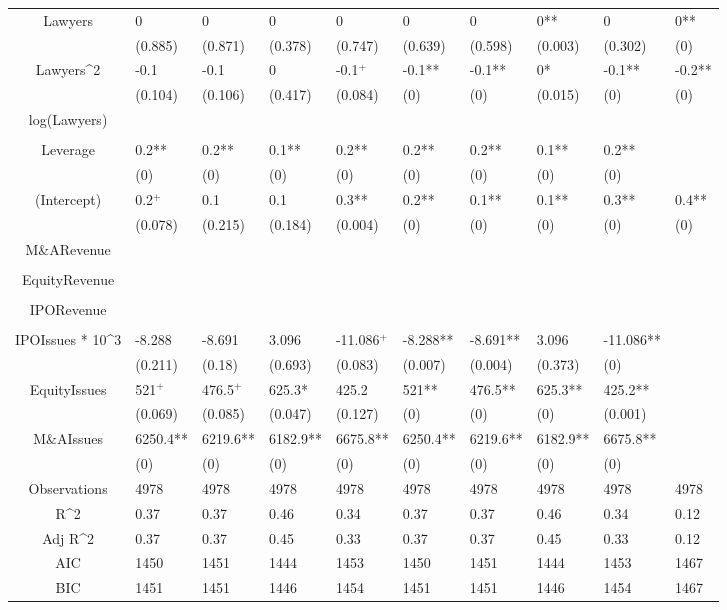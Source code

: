 \documentclass{article}
\begin{document}
\begin{table}[H]
\begin{tabular}{|clllllllll|}
Lawyers & 0 & 0 & 0 & 0 & 0 & 0 & 0** & 0 & 0** \\ 
   & (0.885) & (0.871) & (0.378) & (0.747) & (0.639) & (0.598) & (0.003) & (0.302) & (0) \\ 
  Lawyers^2 & -0.1 & -0.1 & 0 & -0.1$^{+}$ & -0.1** & -0.1** & 0* & -0.1** & -0.2** \\ 
   & (0.104) & (0.106) & (0.417) & (0.084) & (0) & (0) & (0.015) & (0) & (0) \\ 
  log(Lawyers) &  &  &  &  &  &  &  &  &  \\ 
   &  &  &  &  &  &  &  &  &  \\ 
  Leverage & 0.2** & 0.2** & 0.1** & 0.2** & 0.2** & 0.2** & 0.1** & 0.2** &  \\ 
   & (0) & (0) & (0) & (0) & (0) & (0) & (0) & (0) &  \\ 
  (Intercept) & 0.2$^{+}$ & 0.1 & 0.1 & 0.3** & 0.2** & 0.1** & 0.1** & 0.3** & 0.4** \\ 
   & (0.078) & (0.215) & (0.184) & (0.004) & (0) & (0) & (0) & (0) & (0) \\ 
  M\&ARevenue &  &  &  &  &  &  &  &  &  \\ 
   &  &  &  &  &  &  &  &  &  \\ 
  EquityRevenue &  &  &  &  &  &  &  &  &  \\ 
   &  &  &  &  &  &  &  &  &  \\ 
  IPORevenue &  &  &  &  &  &  &  &  &  \\ 
   &  &  &  &  &  &  &  &  &  \\ 
  IPOIssues * 10^3 & -8.288 & -8.691 & 3.096 & -11.086$^{+}$ & -8.288** & -8.691** & 3.096 & -11.086** &  \\ 
   & (0.211) & (0.18) & (0.693) & (0.083) & (0.007) & (0.004) & (0.373) & (0) &  \\ 
  EquityIssues & 521$^{+}$ & 476.5$^{+}$ & 625.3* & 425.2 & 521** & 476.5** & 625.3** & 425.2** &  \\ 
   & (0.069) & (0.085) & (0.047) & (0.127) & (0) & (0) & (0) & (0.001) &  \\ 
  M\&AIssues & 6250.4** & 6219.6** & 6182.9** & 6675.8** & 6250.4** & 6219.6** & 6182.9** & 6675.8** &  \\ 
   & (0) & (0) & (0) & (0) & (0) & (0) & (0) & (0) &  \\ 
  \hline 
 Observations & 4978 & 4978 & 4978 & 4978 & 4978 & 4978 & 4978 & 4978 & 4978 \\ 
  R^2 & 0.37 & 0.37 & 0.46 & 0.34 & 0.37 & 0.37 & 0.46 & 0.34 & 0.12 \\ 
  Adj R^2 & 0.37 & 0.37 & 0.45 & 0.33 & 0.37 & 0.37 & 0.45 & 0.33 & 0.12 \\ 
  AIC & 1450 & 1451 & 1444 & 1453 & 1450 & 1451 & 1444 & 1453 & 1467 \\ 
  BIC & 1451 & 1451 & 1446 & 1454 & 1451 & 1451 & 1446 & 1454 & 1467 \\ 
   \hline
\end{tabular}
 
\end{table}
\end{document}
